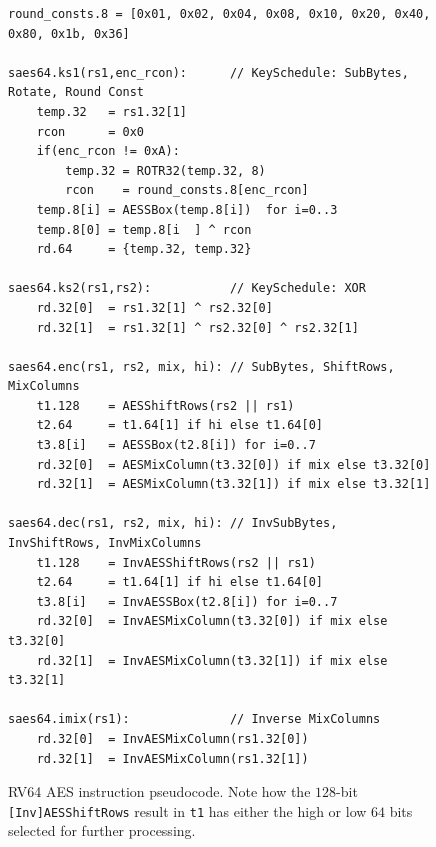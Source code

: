 \begin{figure}[h]
\begin{lstlisting}[language=pseudo]
round_consts.8 = [0x01, 0x02, 0x04, 0x08, 0x10, 0x20, 0x40, 0x80, 0x1b, 0x36]

saes64.ks1(rs1,enc_rcon):      // KeySchedule: SubBytes, Rotate, Round Const
    temp.32   = rs1.32[1]
    rcon      = 0x0
    if(enc_rcon != 0xA):
        temp.32 = ROTR32(temp.32, 8)
        rcon    = round_consts.8[enc_rcon]
    temp.8[i] = AESSBox(temp.8[i])  for i=0..3
    temp.8[0] = temp.8[i  ] ^ rcon
    rd.64     = {temp.32, temp.32}

saes64.ks2(rs1,rs2):           // KeySchedule: XOR
    rd.32[0]  = rs1.32[1] ^ rs2.32[0]
    rd.32[1]  = rs1.32[1] ^ rs2.32[0] ^ rs2.32[1]

saes64.enc(rs1, rs2, mix, hi): // SubBytes, ShiftRows, MixColumns
    t1.128    = AESShiftRows(rs2 || rs1)
    t2.64     = t1.64[1] if hi else t1.64[0]
    t3.8[i]   = AESSBox(t2.8[i]) for i=0..7
    rd.32[0]  = AESMixColumn(t3.32[0]) if mix else t3.32[0]
    rd.32[1]  = AESMixColumn(t3.32[1]) if mix else t3.32[1]

saes64.dec(rs1, rs2, mix, hi): // InvSubBytes, InvShiftRows, InvMixColumns
    t1.128    = InvAESShiftRows(rs2 || rs1)
    t2.64     = t1.64[1] if hi else t1.64[0]
    t3.8[i]   = InvAESSBox(t2.8[i]) for i=0..7
    rd.32[0]  = InvAESMixColumn(t3.32[0]) if mix else t3.32[0]
    rd.32[1]  = InvAESMixColumn(t3.32[1]) if mix else t3.32[1]

saes64.imix(rs1):              // Inverse MixColumns
    rd.32[0]  = InvAESMixColumn(rs1.32[0])
    rd.32[1]  = InvAESMixColumn(rs1.32[1])
\end{lstlisting}
\caption{
RV64 AES instruction pseudocode.
Note how the $128$-bit {\tt [Inv]AESShiftRows} result in {\tt t1} has
either the high or low $64$ bits selected for further processing.
}
\label{fig:pesudo:aes:rv64}
\end{figure}


